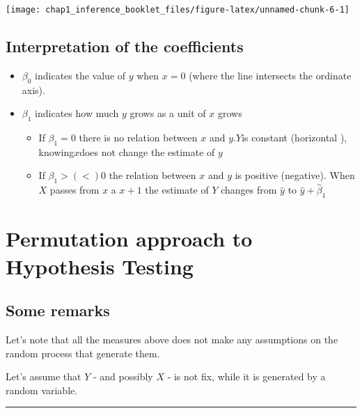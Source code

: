 \documentclass[]{article}
\providecommand{\tightlist}{%
  \setlength{\itemsep}{0pt}\setlength{\parskip}{0pt}}
\begin{document}
\begin{center}\texttt{[image: chap1\_inference\_booklet\_files/figure-latex/unnamed-chunk-6-1]} \end{center}

\subsection{Interpretation of the
coefficients}\label{interpretation-of-the-coefficients}

\begin{itemize}
\tightlist
\item
  \(\beta_0\) indicates the value of \(y\) when \(x=0\) (where the line
  intersects the ordinate axis).
\item
  \(\beta_1\) indicates how much \(y\) grows as a unit of \(x\) grows

  \begin{itemize}
  \tightlist
  \item
    If \(\beta_1=0\) there is no relation between \(x\) and
    \(y\).\(Y\)is constant (horizontal ), knowing\(x\)does not change
    the estimate of \(y\)
  \item
    If \(\beta_1> (<) 0\) the relation between \(x\) and \(y\) is
    positive (negative). When \(X\) passes from \(x\) a \(x + 1\) the
    estimate of \(Y\) changes from \(\hat{y}\) to
    \(\hat{y} + \hat{\beta}_1\)
  \end{itemize}
\end{itemize}

\section{Permutation approach to Hypothesis
Testing}\label{permutation-approach-to-hypothesis-testing}

\subsection{Some remarks}\label{some-remarks}

Let's note that all the measures above does not make any assumptions on
the random process that generate them.

Let's assume that \(Y\) - and possibly \(X\) - is not fix, while it is
generated by a random variable.

\begin{center}\rule{0.5\linewidth}{\linethickness}\end{center}
\end{document}
